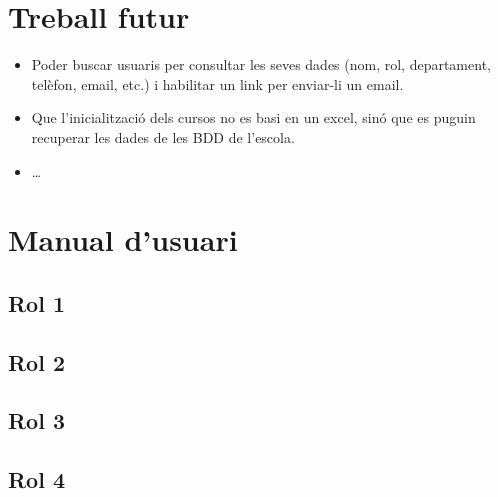 \documentclass[a4paper,12pt]{ThesisStyle}
\begin{document}
\chapter{Treball futur}
\label{cap:treball_futur}

\begin{itemize}
  \item Poder buscar usuaris per consultar les seves dades (nom, rol, departament, telèfon, email, etc.) i habilitar un link per enviar-li un email.
  \item Que l'inicialització dels cursos no es basi en un excel, sinó que es puguin recuperar les dades de les BDD de l'escola.
  \item \ldots
\end{itemize}


\backmatter





%

\chapter*{Manual d'usuari}

\section*{Rol 1}



\section*{Rol 2}



\section*{Rol 3}



\section*{Rol 4}
\end{document}
